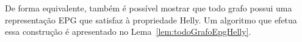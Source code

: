  
 
 De forma equivalente, também é possível mostrar que todo grafo possui uma representação EPG que satisfaz à propriedade Helly. Um algoritmo que efetua essa construção é apresentado no Lema~\ref{lem:todoGrafoEpgHelly}.
 
